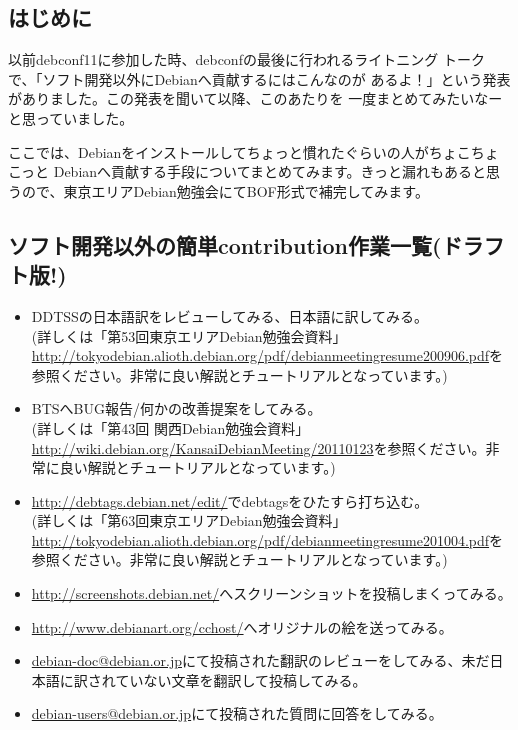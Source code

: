\documentclass[mingoth,a4paper]{jsarticle}
\begin{document}
\subsection{はじめに}

 以前debconf11に参加した時、debconfの最後に行われるライトニング
トークで、「ソフト開発以外にDebianへ貢献するにはこんなのが
あるよ！」という発表がありました。この発表を聞いて以降、このあたりを
一度まとめてみたいなーと思っていました。

 ここでは、Debianをインストールしてちょっと慣れたぐらいの人がちょこちょこっと
Debianへ貢献する手段についてまとめてみます。きっと漏れもあると思うので、東京エリアDebian勉強会にてBOF形式で補完してみます。

\subsection{ソフト開発以外の簡単contribution作業一覧(ドラフト版!)}

\begin{itemize}
\item DDTSSの日本語訳をレビューしてみる、日本語に訳してみる。\\
(詳しくは「第53回東京エリアDebian勉強会資料」\url{http://tokyodebian.alioth.debian.org/pdf/debianmeetingresume200906.pdf}を参照ください。非常に良い解説とチュートリアルとなっています。)
\item BTSへBUG報告/何かの改善提案をしてみる。\\
(詳しくは「第43回 関西Debian勉強会資料」\url{http://wiki.debian.org/KansaiDebianMeeting/20110123}を参照ください。非常に良い解説とチュートリアルとなっています。)
\item \url{http://debtags.debian.net/edit/}でdebtagsをひたすら打ち込む。\\
(詳しくは「第63回東京エリアDebian勉強会資料」\url{http://tokyodebian.alioth.debian.org/pdf/debianmeetingresume201004.pdf}を参照ください。非常に良い解説とチュートリアルとなっています。)
\item \url{http://screenshots.debian.net/}へスクリーンショットを投稿しまくってみる。
\item \url{http://www.debianart.org/cchost/}へオリジナルの絵を送ってみる。
\item \url{debian-doc@debian.or.jp}にて投稿された翻訳のレビューをしてみる、未だ日本語に訳されていない文章を翻訳して投稿してみる。
\item \url{debian-users@debian.or.jp}にて投稿された質問に回答をしてみる。
\end{itemize}
\end{document}
